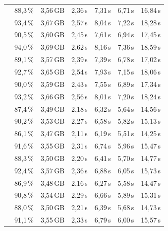 \begin{table}[H]
\begin{tabularx}{\textwidth}{C C C C C C C}
                       & 88{,}3\,\% & 3{,}56\,GB & 2{,}36\,s & 7{,}31\,s & 6{,}71\,s & 16{,}84\,s \\
                       & 93{,}4\,\% & 3{,}67\,GB & 2{,}57\,s & 8{,}04\,s & 7{,}22\,s & 18{,}28\,s \\
                       & 90{,}5\,\% & 3{,}60\,GB & 2{,}45\,s & 7{,}61\,s & 6{,}94\,s & 17{,}45\,s \\
                       & 94{,}0\,\% & 3{,}69\,GB & 2{,}62\,s & 8{,}16\,s & 7{,}36\,s & 18{,}59\,s \\
                       & 89{,}1\,\% & 3{,}57\,GB & 2{,}39\,s & 7{,}39\,s & 6{,}78\,s & 17{,}02\,s \\
                       & 92{,}7\,\% & 3{,}65\,GB & 2{,}54\,s & 7{,}93\,s & 7{,}15\,s & 18{,}06\,s \\
                       & 90{,}0\,\% & 3{,}59\,GB & 2{,}43\,s & 7{,}55\,s & 6{,}89\,s & 17{,}34\,s \\
                       & 93{,}2\,\% & 3{,}66\,GB & 2{,}56\,s & 8{,}01\,s & 7{,}20\,s & 18{,}24\,s \\
    \addlinespace[2pt]
                      & 87{,}4\,\% & 3{,}49\,GB & 2{,}18\,s & 6{,}32\,s & 5{,}64\,s & 14{,}56\,s \\
                       & 90{,}2\,\% & 3{,}53\,GB & 2{,}27\,s & 6{,}58\,s & 5{,}82\,s & 15{,}13\,s \\
                       & 86{,}1\,\% & 3{,}47\,GB & 2{,}11\,s & 6{,}19\,s & 5{,}51\,s & 14{,}25\,s \\
                       & 91{,}6\,\% & 3{,}55\,GB & 2{,}31\,s & 6{,}74\,s & 5{,}96\,s & 15{,}47\,s \\
                       & 88{,}3\,\% & 3{,}50\,GB & 2{,}20\,s & 6{,}41\,s & 5{,}70\,s & 14{,}77\,s \\
                       & 92{,}4\,\% & 3{,}57\,GB & 2{,}36\,s & 6{,}88\,s & 6{,}05\,s & 15{,}73\,s \\
                       & 86{,}9\,\% & 3{,}48\,GB & 2{,}16\,s & 6{,}27\,s & 5{,}58\,s & 14{,}47\,s \\
                       & 90{,}8\,\% & 3{,}54\,GB & 2{,}29\,s & 6{,}66\,s & 5{,}89\,s & 15{,}31\,s \\
                       & 88{,}0\,\% & 3{,}50\,GB & 2{,}21\,s & 6{,}39\,s & 5{,}68\,s & 14{,}73\,s \\
                       & 91{,}1\,\% & 3{,}55\,GB & 2{,}33\,s & 6{,}79\,s & 6{,}00\,s & 15{,}57\,s \\
    \bottomrule
  \end{tabularx}
\end{table}


